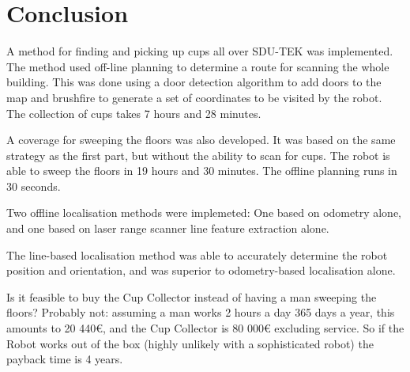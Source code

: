 \section{Conclusion}
\label{sec:conclusion}
A method for finding and picking up cups all over SDU-TEK was implemented. The method used off-line planning to determine a route for scanning the whole building. 
This was done using a door detection algorithm to add doors to the map and brushfire to generate a set of coordinates to be visited by the robot.
The collection of cups takes 7 hours and 28 minutes.

A coverage for sweeping the floors was also developed. It was based on the same strategy as the first part, but without the ability to scan for cups. The robot is able to sweep the floors in 19 hours and 30 minutes. The offline planning runs in 30 seconds. 

Two offline localisation methods were implemeted:
One based on odometry alone, and one based on laser range scanner line feature extraction alone.

The line-based localisation method was able to accurately determine the robot position and orientation,
and was superior to odometry-based localisation alone.

Is it feasible to buy the Cup Collector instead of having a man sweeping the floors?
Probably not: assuming a man works 2 hours a day 365 days a year, this amounts to 20 440€,
and the Cup Collector is 80 000€ excluding service.
So if the Robot works out of the box (highly unlikely with a sophisticated robot) the payback time is 4 years.